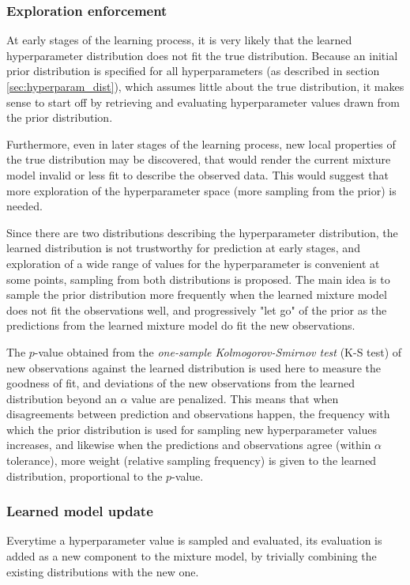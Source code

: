 	\subsubsection{Exploration enforcement}
	At early stages of the learning process, it is very likely that the learned hyperparameter
	distribution does not fit the true distribution. Because an initial prior distribution is
	specified for all hyperparameters (as described in section \ref{sec:hyperparam_dist}), which
	assumes little about the true distribution, it makes sense to start off by retrieving and
	evaluating hyperparameter values drawn from the prior distribution.

	Furthermore, even in later stages of the learning process, new local properties of the
	true distribution may be discovered, that would render the current mixture model invalid or less
	fit to describe the observed data. This would suggest that more exploration of the
	hyperparameter space (more sampling from the prior) is needed.

	Since there are two distributions describing the hyperparameter distribution, the learned
	distribution is not trustworthy for prediction at early stages, and exploration of a wide range
	of values for the hyperparameter is convenient at some points, sampling from both distributions
	is proposed. The main idea is to sample the prior distribution more frequently when the learned
	mixture model does not fit the observations well, and progressively "let go" of the prior as the
	predictions from the learned mixture model do fit the new observations.

	The $p$-value obtained from the \emph{one-sample Kolmogorov-Smirnov test} (K-S test) of new
	observations against the learned distribution is used here to measure the goodness of fit, and
	deviations of the new observations from the learned distribution beyond an $\alpha$ value are
	penalized. This means that when disagreements between prediction and observations happen, the
	frequency with which the prior distribution is used for sampling new hyperparameter values
	increases, and likewise when the predictions and observations agree (within $\alpha$ tolerance),
	more weight (relative sampling frequency) is given to the learned distribution, proportional to
	the $p$-value.

	\subsubsection{Learned model update}
	Everytime a hyperparameter value is sampled and evaluated, its evaluation is added as a new
	component to the mixture model, by trivially combining the existing distributions with the new
	one.

